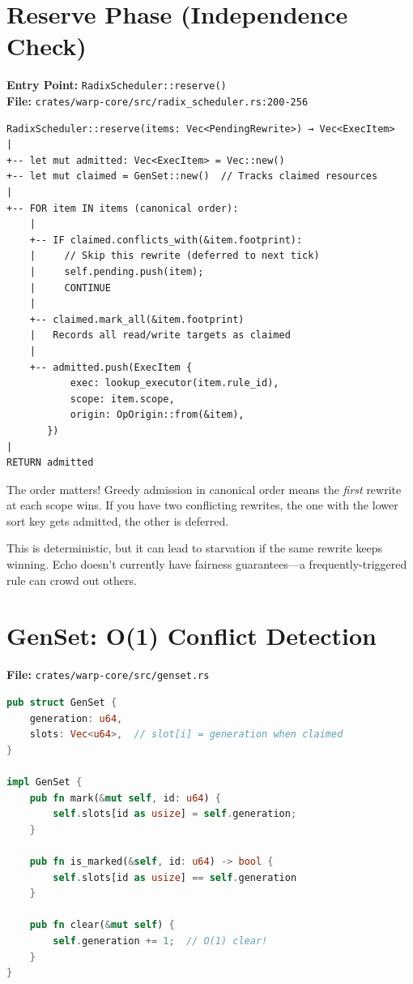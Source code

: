 \section{Reserve Phase (Independence Check)}

\textbf{Entry Point:} \texttt{RadixScheduler::reserve()} \\
\textbf{File:} \texttt{crates/warp-core/src/radix\_scheduler.rs:200-256}

\begin{verbatim}
RadixScheduler::reserve(items: Vec<PendingRewrite>) → Vec<ExecItem>
|
+-- let mut admitted: Vec<ExecItem> = Vec::new()
+-- let mut claimed = GenSet::new()  // Tracks claimed resources
|
+-- FOR item IN items (canonical order):
    |
    +-- IF claimed.conflicts_with(&item.footprint):
    |     // Skip this rewrite (deferred to next tick)
    |     self.pending.push(item);
    |     CONTINUE
    |
    +-- claimed.mark_all(&item.footprint)
    |   Records all read/write targets as claimed
    |
    +-- admitted.push(ExecItem {
           exec: lookup_executor(item.rule_id),
           scope: item.scope,
           origin: OpOrigin::from(&item),
       })
|
RETURN admitted
\end{verbatim}

\begin{watchout}
The order matters! Greedy admission in canonical order means the \emph{first} rewrite at each scope wins. If you have two conflicting rewrites, the one with the lower sort key gets admitted, the other is deferred.

This is deterministic, but it can lead to starvation if the same rewrite keeps winning. Echo doesn't currently have fairness guarantees---a frequently-triggered rule can crowd out others.
\end{watchout}

\section{GenSet: O(1) Conflict Detection}

\textbf{File:} \texttt{crates/warp-core/src/genset.rs}

\begin{lstlisting}[language=Rust]
pub struct GenSet {
    generation: u64,
    slots: Vec<u64>,  // slot[i] = generation when claimed
}

impl GenSet {
    pub fn mark(&mut self, id: u64) {
        self.slots[id as usize] = self.generation;
    }

    pub fn is_marked(&self, id: u64) -> bool {
        self.slots[id as usize] == self.generation
    }

    pub fn clear(&mut self) {
        self.generation += 1;  // O(1) clear!
    }
}
\end{lstlisting}

